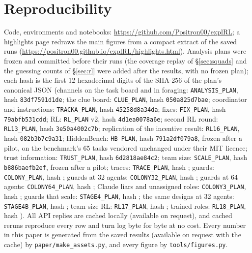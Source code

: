 \documentclass{article}
\begin{document}
\section{Reproducibility}
\label{app:repro}
Code, environments and notebooks: \url{https://github.com/Positron00/explRL}; a highlights page redraws the main figures from a compact extract of the saved runs (\url{https://positron00.github.io/explRL/highlights.html}). Analysis plans were frozen and committed before their runs (the coverage replay of \S\ref{sec:squads} and the guessing counts of \S\ref{sec:rl} were added after the results, with no frozen plan); each hash is the first 12 hexadecimal digits of the SHA-256 of the plan's canonical JSON (channels on the task board and in foraging: \texttt{ANALYSIS\_PLAN}, hash \texttt{83df7591d1de}; the clue board: \texttt{CLUE\_PLAN}, hash \texttt{050a825d7bae}; coordinator and instructions: \texttt{TRACKA\_PLAN}, hash \texttt{45258d8a34da}; fixes: \texttt{FIX\_PLAN}, hash \texttt{79abfb531cdd}; RL: \texttt{RL\_PLAN} v2, hash \texttt{4d1ea0078a6e}; second RL round: \texttt{RL13\_PLAN}, hash \texttt{3e50a4002c7b}; replication of the incentive result: \texttt{RL16\_PLAN}, hash \texttt{082b3b7c9a31}; HiddenBench: \texttt{HB\_PLAN}, hash \texttt{791a2df079a8}, frozen after a pilot, on the benchmark's 65 tasks vendored unchanged under their MIT licence; trust information: \texttt{TRUST\_PLAN}, hash \texttt{6d2818ae84c2}; team size: \texttt{SCALE\_PLAN}, hash \texttt{b886baefb2ef}, frozen after a pilot; traces: \texttt{TRACE\_PLAN}, hash \texttt{\TracePlanHash}; guards: \texttt{COLONY\_PLAN}, hash \texttt{\ColonyPlanHash}; guards at 32 agents: \texttt{COLONY32\_PLAN}, hash \texttt{\GuardsThirtyTwoPlanHash}; guards at 64 agents: \texttt{COLONY64\_PLAN}, hash \texttt{\GuardsSixtyFourPlanHash}; Claude liars and unassigned roles: \texttt{COLONY3\_PLAN}, hash \texttt{\StagePlanHash}; guards that scale: \texttt{STAGE4\_PLAN}, hash \texttt{\FourPlanHash}; the same designs at 32 agents: \texttt{STAGE4B\_PLAN}, hash \texttt{\FourBPlanHash}; team-size RL: \texttt{RL17\_PLAN}, hash \texttt{\SeventeenPlanHash}; trained roles: \texttt{RL18\_PLAN}, hash \texttt{\PartBPlanHash}). All API replies are cached locally (available on request), and cached reruns reproduce every row and turn log byte for byte at no cost. Every number in this paper is generated from the saved results (available on request with the cache) by \texttt{paper/make\_assets.py}, and every figure by \texttt{tools/figures.py}.
\end{document}
